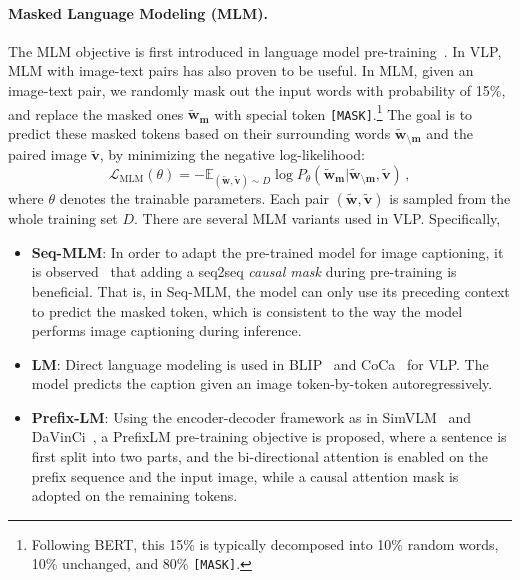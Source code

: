 \paragraph{Masked Language Modeling (MLM).} 
The MLM objective is first introduced in language model pre-training~\citep[\textit{e.g.,}][]{devlin-etal-2019-bert,liu2019roberta}. In VLP, MLM with image-text pairs has also proven to be useful.
In MLM, given an image-text pair, we randomly mask out the input words with probability of 15\%, and replace the masked ones $\tilde{\mathbf{w}}_\mathbf{m}$ with special token \texttt{[MASK]}.\footnote{Following BERT, this 15\% is typically decomposed into 10\% random words, 10\% unchanged, and 80\% \texttt{[MASK]}.}
The goal is to predict these masked tokens based on their surrounding words $\tilde{\mathbf{w}}_{\setminus \mathbf{m}}$ and the paired image $\tilde{\mathbf{v}}$, by minimizing the negative log-likelihood:
\begin{equation}
    \mathcal{L}_{\text{MLM}}(\theta) = -\mathbb{E}_{(\tilde{\mathbf{w}}, \tilde{\mathbf{v}})\sim D} \log P_{\theta}(\tilde{\mathbf{w}}_\mathbf{m} | \tilde{\mathbf{w}}_{\setminus \mathbf{m}}, \tilde{\mathbf{v}})\,,
\end{equation}
where $\theta$ denotes the trainable parameters. 
Each pair $(\tilde{\mathbf{w}}, \tilde{\mathbf{v}})$ is sampled from the whole training set $D$. There are several MLM variants used in VLP. Specifically,
\begin{itemize}[leftmargin=*]
    \item \textbf{Seq-MLM}: In order to adapt the pre-trained model for image captioning, it is observed~\citep{zhou2020unified,wang2021ufo} that adding a seq2seq \emph{causal mask} during pre-training is beneficial. That is, in Seq-MLM, the model can only use its preceding context to predict the masked token, which is consistent to the way the model performs image captioning during inference.  
    \item \textbf{LM}: Direct language modeling is used in BLIP~\citep{li2022blip} and CoCa~\citep{yu2022coca} for VLP. The model predicts the caption given an image token-by-token autoregressively. 
    \item \textbf{Prefix-LM}: Using the encoder-decoder framework as in SimVLM~\citep{wang2021simvlm} and DaVinCi~\citep{diao2023write}, a PrefixLM pre-training objective is proposed, where a sentence is first split into two parts, and the bi-directional attention is enabled on the prefix sequence and the input image, while a causal attention mask is adopted on the remaining tokens. 
\end{itemize}

